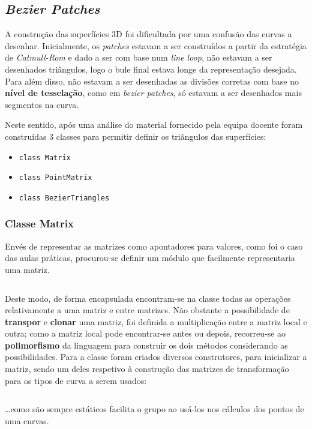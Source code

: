 \documentclass[relatorio.tex]{subfiles}
\begin{document}
    
\subsection{\textit{Bezier Patches}} \label{subsec:bezier_p}

A construção das superfícies 3D foi dificultada por uma confusão das curvas a desenhar. 
Inicialmente, os \textit{patches} estavam a ser construídos a partir da estratégia de \textit{Catmull-Rom} e
dado a ser com base num \textit{line loop}, não estavam a ser desenhados triângulos, logo o bule final estava longe da representação desejada.
Para além disso, não estavam a ser desenhadas as divisões corretas com base no \textbf{nível de tesselação}, como em \textit{bezier patches},
só estavam a ser desenhados mais segmentos na curva.

Neste sentido, após uma análise do material fornecido pela equipa docente foram construídas 3 classes para permitir definir os triângulos das superfícies:
\begin{itemize}
    \item \texttt{class Matrix}
    \item \texttt{class PointMatrix}
    \item \texttt{class BezierTriangles}
\end{itemize}

\subsubsection{Classe Matrix}
Envés de representar as matrizes como apontadores para valores, como foi o caso das aulas práticas,
procurou-se definir um módulo que facilmente representaria uma matriz. 
\begin{code}
    \label{code:matrix.h}
    \inputminted[firstline=14, lastline=19]{cpp}{../../cartesian/matrix.h}
\end{code}

Deste modo, de forma encapsulada encontram-se na classe todas as operações relativamente a uma matriz e entre matrizes.
Não obstante a possibilidade de \textbf{transpor} e \textbf{clonar} uma matriz, foi definida a multiplicação entre a matriz local e outra; 
como a matriz local pode encontrar-se antes ou depois, recorreu-se ao \textbf{polimorfismo} da linguagem para construir os dois métodos 
considerando as possibilidades.
Para a classe foram criados diversos construtores, para inicializar a matriz, sendo um deles respetivo à construção das matrizes 
de transformação para os tipos de curva a serem usados:
\begin{code}
    \label{code:matrix.h}
    \inputminted[firstline=7, lastline=12]{cpp}{../../cartesian/matrix.h}
\end{code}
\dots como são sempre estáticos facilita o grupo ao usá-los nos cálculos dos pontos de uma curvas.
\end{document}
